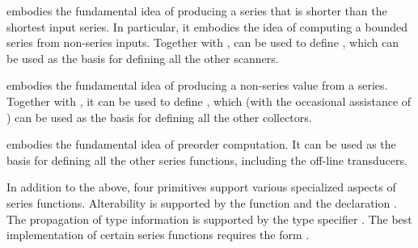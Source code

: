  embodies the fundamental idea of producing a series that is
shorter than the shortest input series.  In particular, it embodies the
idea of computing a bounded series from non-series inputs.  Together with
,  can be used to define , which
can be used as the basis for defining all the other scanners.

 embodies the fundamental idea of producing a
non-series value from a series.  Together with , it
can be used to define , which (with the occasional
assistance of ) can be used as the basis for defining all the other
collectors. 

 embodies the fundamental idea of preorder computation.  It
can be used as the basis for defining all the other series functions,
including the off-line transducers.

In addition to the above, four primitives support
various specialized aspects of series functions.  Alterability is
supported by the function  and the declaration 
.  The propagation of type information is
supported by the type specifier .  The best
implementation of certain series functions requires the form 
.

